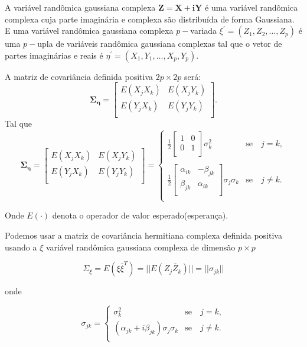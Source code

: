 A variável randômica gaussiana complexa $\mathbf{Z=X+iY}$ é uma variável randômica complexa cuja parte imaginária e complexa são distribuída de forma Gaussiana.  E uma variável randômica gaussiana complexa $p-$variada $\xi^{'}=(Z_1,Z_2,\dots,Z_p)$ é uma $p-$upla  de variáveis randômica gaussiana complexas tal que o vetor de partes imaginárias e reais é $\eta^{'}=(X_1,Y_1,\dots,X_p,Y_p)$.

A matriz de covariância definida positiva $2p\times 2p$ será:
$$
\mathbf{\Sigma_{\eta}} = \left[
\begin{array}{cc}
	E(X_jX_k)  & E(X_jY_k)  \\
	E(Y_jX_k)  & E(Y_jY_k)  \\
\end{array}
\right].
$$
Tal que
$$
\mathbf{\Sigma_{\eta}} = \left[
\begin{array}{cc}
	E(X_jX_k)  & E(X_jY_k)  \\
	E(Y_jX_k)  & E(Y_jY_k)  \\
\end{array}
\right]= \left\{
\begin{array}{cc}
	\frac{1}{2}\left[
\begin{array}{cc}
	 1 & 0  \\
	 0 & 1  \\
\end{array}
	\right]\sigma^{2}_{k}  & \mbox{se}\quad j=k, \\
	& \\
	\frac{1}{2}\left[
\begin{array}{cc}
	\alpha_{ik} & -\beta_{jk}  \\
	 \beta_{jk} & \alpha_{ik}  \\
\end{array}
	\right]\sigma_j\sigma_k  & \mbox{se}\quad j\neq k.   \\
\end{array}
\right.
$$

Onde $E(\cdot)$ denota o operador de valor esperado(esperança).

Podemos usar a matriz de covariância hermitiana complexa definida positiva usando a $\xi$ variável randômica gaussiana complexa de dimensão $p\times p$

$$\Sigma_{\xi}=E(\xi\bar{\xi}^{T})=||E(Z_j\bar{Z}_k)||=||\sigma_{jk}||$$

onde

$$
\sigma_{jk} = \left\{
\begin{array}{cc}
	\sigma_k^2                                & \mbox{se}\quad j=k,  \\
	(\alpha_{jk}+i\beta_{jk})\sigma_j\sigma_k & \mbox{se}\quad j\neq k. \\
\end{array}
\right.
$$


